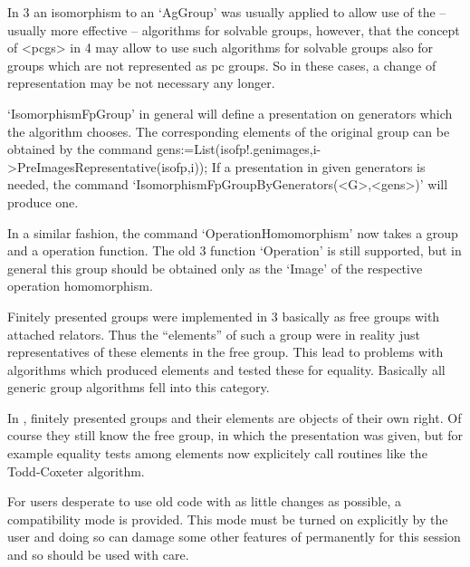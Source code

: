 In {\GAP}3 an isomorphism to an `AgGroup' was usually applied to allow use of
the -- usually more effective -- algorithms for solvable groups, however,
that the concept of <pcgs> in {\GAP}4 may allow to use such algorithms for
solvable groups also for groups which are not represented as pc groups.
So in these cases, a change of representation may be not necessary any
longer.

`IsomorphismFpGroup' in general will define a presentation on generators
which the algorithm chooses. The corresponding elements of the original
group can be obtained by the command
\begintt
gens:=List(isofp!.genimages,i->PreImagesRepresentative(isofp,i));
\endtt
If a presentation in given generators is needed, the command
`IsomorphismFpGroupByGenerators(<G>,<gens>)' will produce one.

In a similar fashion, the command `OperationHomomorphism' now takes a group
and a
operation function. The old {\GAP}3 function `Operation' is still supported,
but in general this group should be obtained only as the `Image' of the
respective operation homomorphism.


Finitely presented groups were implemented in {\GAP}3 basically as free
groups with attached relators. Thus the ``elements'' of such a group were in
reality just representatives of these elements in the free group.
This lead to problems with algorithms which produced elements and tested
these for equality. Basically all generic group algorithms fell into this
category.

In {}, finitely presented groups and their elements are
objects of their own right. Of course they still know the free group, in
which the presentation was given, but for example equality tests among
elements now explicitely call routines like the Todd-Coxeter algorithm.  



For users desperate to use old code with as little changes as possible, a
compatibility mode is provided. This mode must be turned on explicitly by
the user and doing so can damage some other features of {\GAP} permanently
for this session and so should be used with care.


